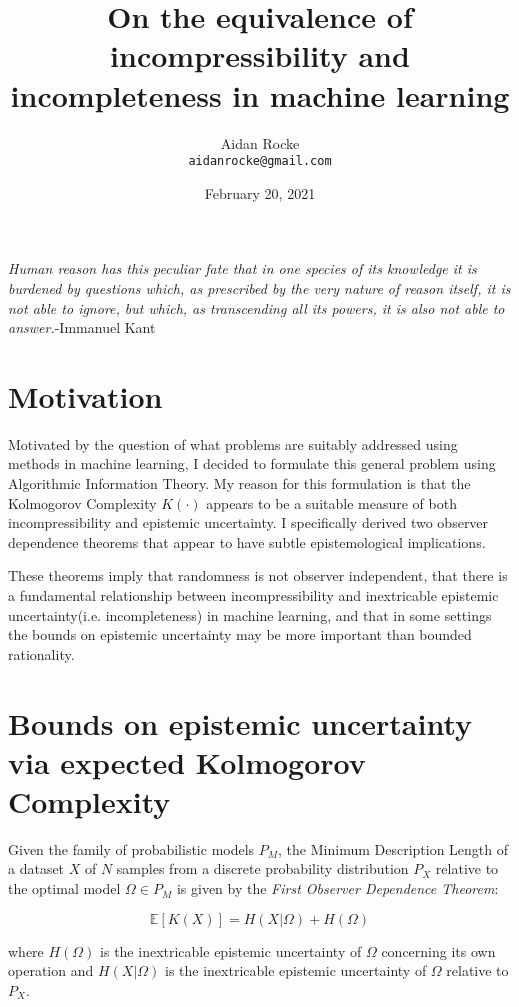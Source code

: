 \documentclass{article}
\title{On the equivalence of incompressibility and incompleteness in machine learning}
\date{February 20, 2021}
\author{%
  Aidan Rocke\\
  \texttt{aidanrocke@gmail.com} \\
}
\begin{document}
\maketitle

\textit{Human reason has this peculiar fate that in one species of its knowledge it is burdened by questions which, as prescribed by the very nature of reason itself, it is not able to ignore, but which, as transcending all its powers, it is also not able to answer.}-Immanuel Kant

\section{Motivation}

Motivated by the question of what problems are suitably addressed using methods in machine learning, I decided to formulate this general problem using Algorithmic Information Theory. My reason for this formulation is that the Kolmogorov Complexity $K(\cdot)$ appears to be a suitable measure of both incompressibility and epistemic uncertainty. I specifically derived two observer dependence theorems that appear to have subtle epistemological implications.

These theorems imply that randomness is not observer independent, that there is a fundamental relationship between incompressibility and inextricable epistemic uncertainty(i.e. incompleteness) in machine learning, and that in some settings the bounds on epistemic uncertainty may be more important than bounded rationality.

\section{Bounds on epistemic uncertainty via expected Kolmogorov Complexity}

Given the family of probabilistic models $P_M$, the Minimum Description Length of a dataset $X$ of $N$ samples
from a discrete probability distribution $P_X$ relative to the optimal model $\Omega \in P_M$ is given by the
\textit{First Observer Dependence Theorem}:

\begin{equation}
\mathbb{E}[K(X)] = H(X|\Omega) + H(\Omega) \tag{1}
\end{equation}

where $H(\Omega)$ is the inextricable epistemic uncertainty of $\Omega$ concerning its own operation and $H(X|\Omega)$
is the inextricable epistemic uncertainty of $\Omega$ relative to $P_X$.
\end{document}
